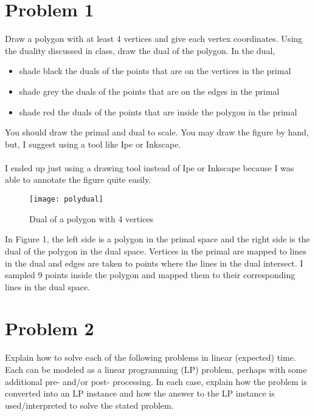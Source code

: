 \documentclass[11pt]{article}
\begin{document}

\newpage
\section*{Problem 1}

Draw a polygon with at least 4 vertices and give each vertex coordinates.
Using the duality discussed in class, draw the dual of the polygon.  In the
dual,
\begin{itemize}
    \item shade black the duals of the points that are on the vertices in the primal
    \item shade grey the duals of the points that are on the edges in the primal
    \item shade red the duals of the points that are inside the polygon in the primal
\end{itemize}

You should draw the primal and dual to scale.  You may draw the figure by hand,
but, I suggest using a tool like Ipe or Inkscape. \\\\

\answer
I ended up just using a drawing tool instead of Ipe or Inkscape because I was able to annotate the figure quite easily.

\begin{figure}[h]
    \centering
    \texttt{[image: polydual]}
    \label{fig:polydual}
    \caption{Dual of a polygon with 4 vertices}
\end{figure}

In Figure 1, the left side is a polygon in the primal space and the right side is the dual of the polygon in the dual space.
Vertices in the primal are mapped to lines in the dual and edges are taken to points where the lines in the dual intersect.
I sampled 9 points inside the polygon and mapped them to their corresponding lines in the dual space.

\newpage
\section*{Problem 2}

Explain how to solve each of the following problems in linear (expected) time.
Each can be modeled as a linear programming (LP) problem, perhaps with some
additional pre- and/or post- processing. In each case, explain how the problem
is converted into an LP instance and how the answer to the LP instance is
used/interpreted to solve the stated problem.
\end{document}
